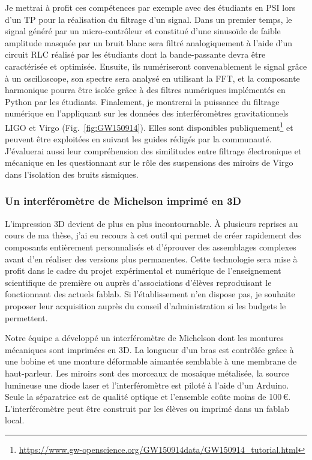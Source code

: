 \documentclass[12pt,a4paper]{article}
\begin{document}
Je mettrai à profit ces compétences par exemple avec des étudiants en PSI lors d'un TP pour la réalisation du filtrage d'un signal.
Dans un premier temps, le signal généré par un micro-contrôleur et constitué d'une sinusoïde de faible amplitude masquée par un bruit blanc sera filtré analogiquement à l'aide d'un circuit RLC réalisé par les étudiants dont la bande-passante devra être caractérisée et optimisée.
Ensuite, ils numériseront convenablement le signal grâce à un oscilloscope, son spectre sera analysé en utilisant la FFT, et la composante harmonique pourra être isolée grâce à des filtres numériques implémentés en Python par les étudiants.
Finalement, je montrerai la puissance du filtrage numérique en l'appliquant sur les données des interféromètres gravitationnels LIGO et Virgo (Fig.~\ref{fig:GW150914}).
Elles sont disponibles publiquement\footnote{\url{https://www.gw-openscience.org/GW150914data/GW150914_tutorial.html}} et peuvent être exploitées en suivant les guides rédigés par la communauté.
J'évaluerai aussi leur compréhension des similitudes entre filtrage électronique et mécanique en les questionnant sur le rôle des suspensions des miroirs de Virgo dans l'isolation des bruits sismiques.

\subsubsection{Un interféromètre de Michelson imprimé en 3D}

L'impression 3D devient de plus en plus incontournable.
À plusieurs reprises au cours de ma thèse, j'ai eu recours à cet outil qui permet de créer rapidement des composants entièrement personnalisés et d'éprouver des assemblages complexes avant d'en réaliser des versions plus permanentes.
Cette technologie sera mise à profit dans le cadre du projet expérimental et numérique de l'enseignement scientifique de première ou auprès d'associations d'élèves reproduisant le fonctionnant des actuels fablab.
Si l'établissement n'en dispose pas, je souhaite proposer leur acquisition auprès du conseil d'administration si les budgets le permettent.

Notre équipe a développé un interféromètre de Michelson dont les montures mécaniques sont imprimées en 3D.
La longueur d'un bras est contrôlée grâce à une bobine et une monture déformable aimantée semblable à une membrane de haut-parleur.
Les miroirs sont des morceaux de mosaïque métalisée, la source lumineuse une diode laser et l'interféromètre est piloté à l'aide d'un Arduino.
Seule la séparatrice est de qualité optique et l'ensemble coûte moins de 100\,\euro.
L'interféromètre peut être construit par les élèves ou imprimé dans un fablab local.
\end{document}
